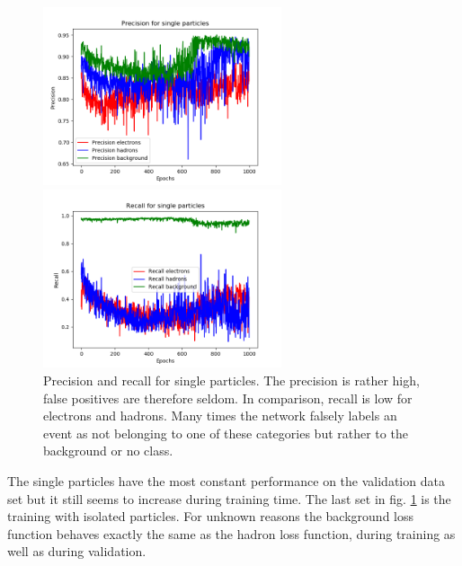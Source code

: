 \begin{figure}
\centering
\begin{minipage}{0.45\textwidth}
\includegraphics[width=7cm]{precisionsingle.png}
\end{minipage}
\begin{minipage}{0.45\textwidth}
\includegraphics[width=7cm]{recallsingle.png}
\end{minipage}
\caption{Precision and recall for single particles. The precision is rather high, false positives are therefore seldom. In comparison, recall is low for electrons and hadrons. Many times the network falsely labels an event as not belonging to one of these categories but rather to the background or no class.}
\label{lossall}
\end{figure}

The single particles have the most constant performance on the validation data set but it still seems to increase during training time. The last set in fig. \ref{lossall} is the training with isolated particles. For unknown reasons the background loss function behaves exactly the same as the hadron loss function, during training as well as during validation. 
